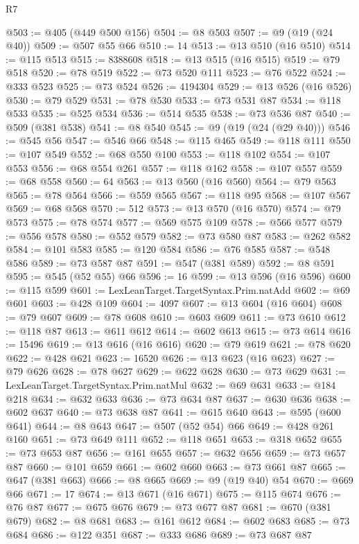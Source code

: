 \begin{lexlean}{R7}
\begin{coremodule}
@503 := @405 (@449 @500 @156)
@504 := @8 @503
@507 := @9 (@19 (@24 @40))
@509 := @507 @55 @66
@510 := 14
@513 := @13 @510 (@16 @510)
@514 := @115 @513
@515 := 8388608
@518 := @13 @515 (@16 @515)
@519 := @79 @518
@520 := @78 @519
@522 := @73 @520 @111
@523 := @76 @522
@524 := @333 @523
@525 := @73 @524
@526 := 4194304
@529 := @13 @526 (@16 @526)
@530 := @79 @529
@531 := @78 @530
@533 := @73 @531 @87
@534 := @118 @533
@535 := @525 @534
@536 := @514 @535
@538 := @73 @536 @87
@540 := @509 (@381 @538)
@541 := @8 @540
@545 := @9 (@19 (@24 (@29 @40)))
@546 := @545 @56
@547 := @546 @66
@548 := @115 @465
@549 := @118 @111
@550 := @107 @549
@552 := @68 @550 @100
@553 := @118 @102
@554 := @107 @553
@556 := @68 @554 @261
@557 := @118 @162
@558 := @107 @557
@559 := @68 @558
@560 := 64
@563 := @13 @560 (@16 @560)
@564 := @79 @563
@565 := @78 @564
@566 := @559 @565
@567 := @118 @95
@568 := @107 @567
@569 := @68 @568
@570 := 512
@573 := @13 @570 (@16 @570)
@574 := @79 @573
@575 := @78 @574
@577 := @569 @575 @109
@578 := @566 @577
@579 := @556 @578
@580 := @552 @579
@582 := @73 @580 @87
@583 := @262 @582
@584 := @101 @583
@585 := @120 @584
@586 := @76 @585
@587 := @548 @586
@589 := @73 @587 @87
@591 := @547 (@381 @589)
@592 := @8 @591
@595 := @545 (@52 @55) @66
@596 := 16
@599 := @13 @596 (@16 @596)
@600 := @115 @599
@601 := LexLeanTarget.TargetSyntax.Prim.natAdd
@602 := @69 @601
@603 := @428 @109
@604 := 4097
@607 := @13 @604 (@16 @604)
@608 := @79 @607
@609 := @78 @608
@610 := @603 @609
@611 := @73 @610
@612 := @118 @87
@613 := @611 @612
@614 := @602 @613
@615 := @73 @614
@616 := 15496
@619 := @13 @616 (@16 @616)
@620 := @79 @619
@621 := @78 @620
@622 := @428 @621
@623 := 16520
@626 := @13 @623 (@16 @623)
@627 := @79 @626
@628 := @78 @627
@629 := @622 @628
@630 := @73 @629
@631 := LexLeanTarget.TargetSyntax.Prim.natMul
@632 := @69 @631
@633 := @184 @218
@634 := @632 @633
@636 := @73 @634 @87
@637 := @630 @636
@638 := @602 @637
@640 := @73 @638 @87
@641 := @615 @640
@643 := @595 (@600 @641)
@644 := @8 @643
@647 := @507 (@52 @54) @66
@649 := @428 @261 @160
@651 := @73 @649 @111
@652 := @118 @651
@653 := @318 @652
@655 := @73 @653 @87
@656 := @161 @655
@657 := @632 @656
@659 := @73 @657 @87
@660 := @101 @659
@661 := @602 @660
@663 := @73 @661 @87
@665 := @647 (@381 @663)
@666 := @8 @665
@669 := @9 (@19 @40) @54
@670 := @669 @66
@671 := 17
@674 := @13 @671 (@16 @671)
@675 := @115 @674
@676 := @76 @87
@677 := @675 @676
@679 := @73 @677 @87
@681 := @670 (@381 @679)
@682 := @8 @681
@683 := @161 @612
@684 := @602 @683
@685 := @73 @684
@686 := @122 @351
@687 := @333 @686
@689 := @73 @687 @87

\end{coremodule}
\end{lexlean}
